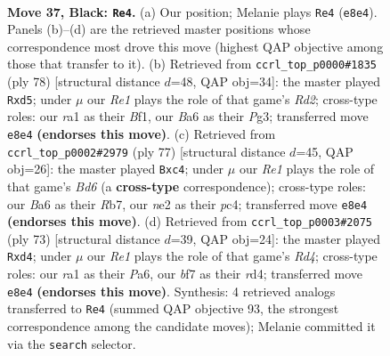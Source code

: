 \documentclass[11pt]{article}
\begin{document}
\clearpage

\begin{figure}[p]\centering
\begin{subfigure}{0.46\textwidth}\centering
\resizebox{\linewidth}{!}{%
\newchessgame
\chessboard[
  setfen={4r3/p4B2/br1p4/2p3k1/2P5/6P1/4NR1K/R7 b - - 1 37},
  showmover=false,
  pgfstyle=straightmove, color=movearrow, markmove={e8-e4}
]}
\caption{}
\end{subfigure}\hfill
\begin{subfigure}{0.46\textwidth}\centering
\resizebox{\linewidth}{!}{%
\newchessgame
\chessboard[
  setfen={8/4kpp1/7p/1P1p3P/5P2/2b1r1P1/3R3K/5B2 w - - 2 40},
  showmover=false,
  pgfstyle=straightmove, color=movearrow, markmove={d2-d5}
]}
\caption{}
\end{subfigure}
\\[4pt]
\begin{subfigure}{0.46\textwidth}\centering
\resizebox{\linewidth}{!}{%
\newchessgame
\chessboard[
  setfen={2r3k1/1r6/8/5p2/2Pp2pP/1P1b2B1/1R4P1/3R2K1 b - - 5 39},
  showmover=false,
  pgfstyle=straightmove, color=movearrow, markmove={d3-c4}
]}
\caption{}
\end{subfigure}\hfill
\begin{subfigure}{0.46\textwidth}\centering
\resizebox{\linewidth}{!}{%
\newchessgame
\chessboard[
  setfen={5k2/3b4/pp3P2/3r2p1/3R2P1/1P6/P4N2/4R1K1 b - - 0 37},
  showmover=false,
  pgfstyle=straightmove, color=movearrow, markmove={d5-d4}
]}
\caption{}
\end{subfigure}
\caption{\textbf{Move 37, Black: \texttt{Re4}.} (a) Our position; Melanie plays \texttt{Re4} (\texttt{e8e4}). Panels (b)--(d) are the retrieved master positions whose correspondence most drove this move (highest QAP objective among those that transfer to it). (b) Retrieved from \texttt{ccrl\_top\_p0000\#1835} (ply 78) [structural distance $d$=48, QAP obj=34]: the master played \texttt{Rxd5}; under $\mu$ our \emph{Re1} plays the role of that game's \emph{Rd2}; cross-type roles: our \emph{r}a1 as their \emph{B}f1, our \emph{B}a6 as their \emph{P}g3; transferred move \texttt{e8e4} \textbf{(endorses this move)}. (c) Retrieved from \texttt{ccrl\_top\_p0002\#2979} (ply 77) [structural distance $d$=45, QAP obj=26]: the master played \texttt{Bxc4}; under $\mu$ our \emph{Re1} plays the role of that game's \emph{Bd6} (a \textbf{cross-type} correspondence); cross-type roles: our \emph{B}a6 as their \emph{R}b7, our \emph{n}e2 as their \emph{p}c4; transferred move \texttt{e8e4} \textbf{(endorses this move)}. (d) Retrieved from \texttt{ccrl\_top\_p0003\#2075} (ply 73) [structural distance $d$=39, QAP obj=24]: the master played \texttt{Rxd4}; under $\mu$ our \emph{Re1} plays the role of that game's \emph{Rd4}; cross-type roles: our \emph{r}a1 as their \emph{P}a6, our \emph{b}f7 as their \emph{r}d4; transferred move \texttt{e8e4} \textbf{(endorses this move)}. Synthesis: 4 retrieved analogs transferred to \texttt{Re4} (summed QAP objective 93, the strongest correspondence among the candidate moves); Melanie committed it via the \texttt{search} selector.}
\label{fig:thought-m73}
\end{figure}
\end{document}
